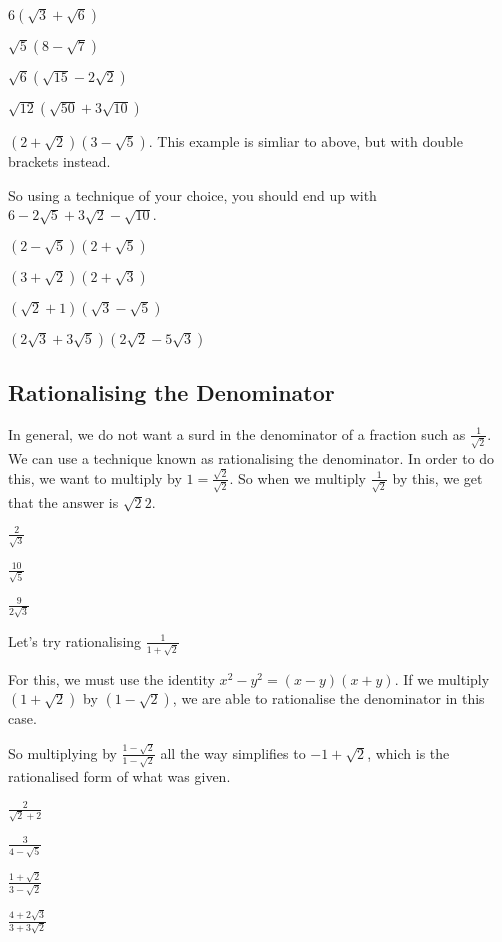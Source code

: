 \documentclass[../maths.tex]{subfiles}
\begin{document}
\ex $6(\sqrt{3}+\sqrt{6})$

\ex $\sqrt{5}(8-\sqrt{7})$

\ex $\sqrt{6}(\sqrt{15}-2\sqrt{2})$

\ex $\sqrt{12}(\sqrt{50}+3\sqrt{10})$

\begin{example}
    $(2+\sqrt{2})(3-\sqrt{5})$. This example is simliar to above, but with double brackets instead.

    So using a technique of your choice, you should end up with $6-2\sqrt{5}+3\sqrt{2}-\sqrt{10}$.
\end{example}

\ex $(2-\sqrt{5})(2+\sqrt{5})$

\ex $(3+\sqrt{2})(2+\sqrt{3})$

\ex $(\sqrt{2}+1)(\sqrt{3}-\sqrt{5})$

\ex $(2\sqrt{3}+3\sqrt{5})(2\sqrt{2}-5\sqrt{3})$
\subsection*{Rationalising the Denominator}
In general, we do not want a surd in the denominator of a fraction such as $\frac{1}{\sqrt{2}}$. We can use a technique known as rationalising the denominator. In order to do this, we want to multiply by $1 = \frac{\sqrt{2}}{\sqrt{2}}$. So when we multiply $\frac{1}{\sqrt{2}}$ by this, we get that the answer is $\sqrt{2}{2}$.

\ex $\frac{2}{\sqrt{3}}$

\ex $\frac{10}{\sqrt{5}}$

\ex $\frac{9}{2\sqrt{3}}$

\begin{example}
    Let's try rationalising $\frac{1}{1+\sqrt{2}}$

    For this, we must use the identity $x^2-y^2=(x-y)(x+y)$. If we multiply $(1+\sqrt{2})$ by $(1-\sqrt{2})$, we are able to rationalise the denominator in this case.

    So multiplying by $\frac{1-\sqrt{2}}{1-\sqrt{2}}$ all the way simplifies to $-1+\sqrt{2}$, which is the rationalised form of what was given.
\end{example}

\ex $\frac{2}{\sqrt{2}+2}$

\ex $\frac{3}{4-\sqrt{5}}$

\ex $\frac{1+\sqrt{2}}{3-\sqrt{2}}$

\ex $\frac{4+2\sqrt{3}}{3+3\sqrt{2}}$
\end{document}
